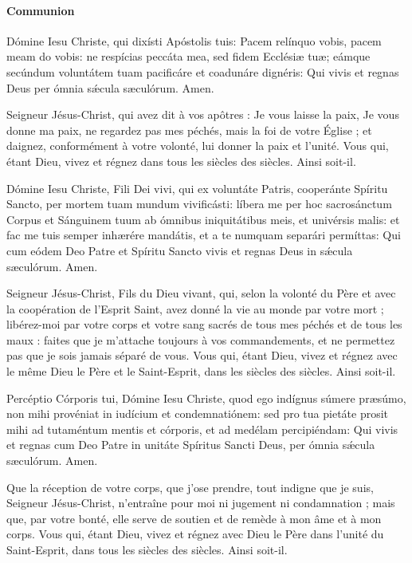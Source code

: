 \documentclass[twoside]{article}
\begin{document}
\paragraph{Communion}
\begin{paracol}{2}

Dómine Iesu Christe, qui dixísti Apóstolis tuis: Pacem relínquo vobis, pacem meam do vobis: ne respícias peccáta mea, sed fidem Ecclésiæ tuæ; eámque secúndum voluntátem tuam pacificáre et coadunáre dignéris: Qui vivis et regnas Deus per ómnia sǽcula sæculórum. Amen.

\switchcolumn

Seigneur Jésus-Christ, qui avez dit à vos apôtres : Je vous laisse la paix, Je vous donne ma paix, ne regardez pas mes péchés, mais la foi de votre Église ; et daignez, conformément à votre volonté, lui donner la paix et l’unité. Vous qui, étant Dieu, vivez et régnez dans tous les siècles des siècles. Ainsi soit-il.

\switchcolumn*

Dómine Iesu Christe, Fili Dei vivi, qui ex voluntáte Patris, cooperánte Spíritu Sancto, per mortem tuam mundum vivificásti: líbera me per hoc sacrosánctum Corpus et Sánguinem tuum ab ómnibus iniquitátibus meis, et univérsis malis: et fac me tuis semper inhærére mandátis, et a te numquam separári permíttas: Qui cum eódem Deo Patre et Spíritu Sancto vivis et regnas Deus in sǽcula sæculórum. Amen.

\switchcolumn

Seigneur Jésus-Christ, Fils du Dieu vivant, qui, selon la volonté du Père et avec la coopération de l’Esprit Saint, avez donné la vie au monde par votre mort ; libérez-moi par votre corps et votre sang sacrés de tous mes péchés et de tous les maux : faites que je m’attache toujours à vos commandements, et ne permettez pas que je sois jamais séparé de vous. Vous qui, étant Dieu, vivez et régnez avec le même Dieu le Père et le Saint-Esprit, dans les siècles des siècles. Ainsi soit-il.

\switchcolumn*

Percéptio Córporis tui, Dómine Iesu Christe, quod ego indígnus súmere præsúmo, non mihi provéniat in iudícium et condemnatiónem: sed pro tua pietáte prosit mihi ad tutaméntum mentis et córporis, et ad medélam percipiéndam: Qui vivis et regnas cum Deo Patre in unitáte Spíritus Sancti Deus, per ómnia sǽcula sæculórum. Amen.

\switchcolumn

Que la réception de votre corps, que j’ose prendre, tout indigne que je suis, Seigneur Jésus-Christ, n’entraîne pour moi ni jugement ni condamnation ; mais que, par votre bonté, elle serve de soutien et de remède à mon âme et à mon corps. Vous qui, étant Dieu, vivez et régnez avec Dieu le Père dans l’unité du Saint-Esprit, dans tous les siècles des siècles. Ainsi soit-il.


\end{paracol}
\end{document}
